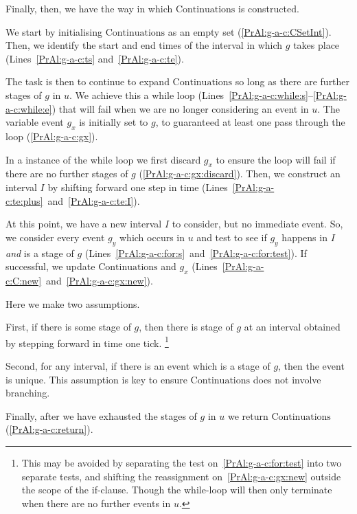 \begin{note}
  Finally, then, we have the way in which \(\text{Continuations}\) is constructed.

  We start by initialising \(\text{Continuations}\) as an empty set (\autoref{PrAl:g-a-c:CSetInt}).
  Then, we identify the start and end times of the interval in which \(g\) takes place (Lines~\ref{PrAl:g-a-c:ts} and~\ref{PrAl:g-a-c:te}).

  The task is then to continue to expand \(\text{Continuations}\) so long as there are further stages of \(g\) in \(u\).
  We achieve this a while loop %
  (Lines~\ref{PrAl:g-a-c:while:s}--\ref{PrAl:g-a-c:while:e}) %
  that will fail when we are no longer considering an event in \(u\).
  The variable event \(g_{x}\) is initially set to \(g\), to guaranteed at least one pass through the loop (\autoref{PrAl:g-a-c:gx}).

  In a instance of the while loop we first discard \(g_{x}\) to ensure the loop will fail if there are no further stages of \(g\) (\autoref{PrAl:g-a-c:gx:discard}).
  Then, we construct an interval \(I\) by shifting forward one step in time (Lines~\ref{PrAl:g-a-c:te:plus}~and~\ref{PrAl:g-a-c:te:I}).

  At this point, we have a new interval \(I\) to consider, but no immediate event.
  So, we consider every event \(g_{y}\) which occurs in \(u\) and test to see if \(g_{y}\) happens in \(I\) \emph{and} is a stage of \(g\) (Lines~\ref{PrAl:g-a-c:for:s}~and~\ref{PrAl:g-a-c:for:test}).
  If successful, we update \(\text{Continuations}\) and \(g_{x}\) (Lines~\ref{PrAl:g-a-c:C:new}~and~\ref{PrAl:g-a-c:gx:new}).

  Here we make two assumptions.

  First, if there is some stage of \(g\), then there is stage of \(g\) at an interval obtained by stepping forward in time one tick.%
  \footnote{
    This may be avoided by separating the test on~\autoref{PrAl:g-a-c:for:test} into two separate tests, and shifting the reassignment on~\autoref{PrAl:g-a-c:gx:new} outside the scope of the if-clause.
    Though the while-loop will then only terminate when there are no further events in \(u\).
  }

  Second, for any interval, if there is an event which is a stage of \(g\), then the event is unique.
  This assumption is key to ensure \(\text{Continuations}\) does not involve branching.

  Finally, after we have exhausted the stages of \(g\) in \(u\) we return \(\text{Continuations}\) (\autoref{PrAl:g-a-c:return}).
\end{note}

